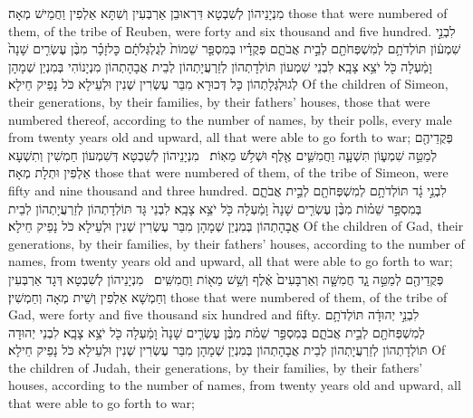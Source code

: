 {מִנְיָנֵיהוֹן לְשִׁבְטָא דִּרְאוּבֵן אַרְבְּעִין וְשִׁתָּא אַלְפִין וַחֲמֵישׁ מְאָה׃}
{those that were numbered of them, of the tribe of Reuben, were forty and six thousand and five hundred.}{}
{לִבְנֵ֣י שִׁמְע֔וֹן תּוֹלְדֹתָ֥ם לְמִשְׁפְּחֹתָ֖ם לְבֵ֣ית אֲבֹתָ֑ם פְּקֻדָ֗יו בְּמִסְפַּ֤ר שֵׁמוֹת֙ לְגֻלְגְּלֹתָ֔ם כׇּל\maqqaf זָכָ֗ר מִבֶּ֨ן עֶשְׂרִ֤ים שָׁנָה֙ וָמַ֔עְלָה כֹּ֖ל יֹצֵ֥א צָבָֽא׃}
{לִבְנֵי שִׁמְעוֹן תּוֹלְדָתְהוֹן לְזַרְעֲיָתְהוֹן לְבֵית אֲבָהָתְהוֹן מִנְיָנוֹהִי בְּמִנְיַן שְׁמָהָן לְגוּלְגְּלָתְהוֹן כָּל דְּכוּרָא מִבַּר עֶשְׂרִין שְׁנִין וּלְעֵילָא כֹּל נָפֵיק חֵילָא׃}
{Of the children of Simeon, their generations, by their families, by their fathers’ houses, those that were numbered thereof, according to the number of names, by their polls, every male from twenty years old and upward, all that were able to go forth to war;}{}
{פְּקֻדֵיהֶ֖ם לְמַטֵּ֣ה שִׁמְע֑וֹן תִּשְׁעָ֧ה וַחֲמִשִּׁ֛ים אֶ֖לֶף וּשְׁלֹ֥שׁ מֵאֽוֹת׃ \petucha }
{מִנְיָנֵיהוֹן לְשִׁבְטָא דְּשִׁמְעוֹן חַמְשִׁין וְתִשְׁעָא אַלְפִין וּתְלָת מְאָה׃}
{those that were numbered of them, of the tribe of Simeon, were fifty and nine thousand and three hundred.}{}
{לִבְנֵ֣י גָ֔ד תּוֹלְדֹתָ֥ם לְמִשְׁפְּחֹתָ֖ם לְבֵ֣ית אֲבֹתָ֑ם בְּמִסְפַּ֣ר שֵׁמ֗וֹת מִבֶּ֨ן עֶשְׂרִ֤ים שָׁנָה֙ וָמַ֔עְלָה כֹּ֖ל יֹצֵ֥א צָבָֽא׃}
{לִבְנֵי גָּד תּוֹלְדָתְהוֹן לְזַרְעֲיָתְהוֹן לְבֵית אֲבָהָתְהוֹן בְּמִנְיַן שְׁמָהָן מִבַּר עֶשְׂרִין שְׁנִין וּלְעֵילָא כֹּל נָפֵיק חֵילָא׃}
{Of the children of Gad, their generations, by their families, by their fathers’ houses, according to the number of names, from twenty years old and upward, all that were able to go forth to war;}{}
{פְּקֻדֵיהֶ֖ם לְמַטֵּ֣ה גָ֑ד חֲמִשָּׁ֤ה וְאַרְבָּעִים֙ אֶ֔לֶף וְשֵׁ֥שׁ מֵא֖וֹת וַחֲמִשִּֽׁים׃ \petucha }
{מִנְיָנֵיהוֹן לְשִׁבְטָא דְּגָד אַרְבְּעִין וְחַמְשָׁא אַלְפִין וְשֵׁית מְאָה וְחַמְשִׁין׃}
{those that were numbered of them, of the tribe of Gad, were forty and five thousand six hundred and fifty.}{}
{לִבְנֵ֣י יְהוּדָ֔ה תּוֹלְדֹתָ֥ם לְמִשְׁפְּחֹתָ֖ם לְבֵ֣ית אֲבֹתָ֑ם בְּמִסְפַּ֣ר שֵׁמֹ֗ת מִבֶּ֨ן עֶשְׂרִ֤ים שָׁנָה֙ וָמַ֔עְלָה כֹּ֖ל יֹצֵ֥א צָבָֽא׃}
{לִבְנֵי יְהוּדָה תּוֹלְדָתְהוֹן לְזַרְעֲיָתְהוֹן לְבֵית אֲבָהָתְהוֹן בְּמִנְיַן שְׁמָהָן מִבַּר עֶשְׂרִין שְׁנִין וּלְעֵילָא כֹּל נָפֵיק חֵילָא׃}
{Of the children of Judah, their generations, by their families, by their fathers’ houses, according to the number of names, from twenty years old and upward, all that were able to go forth to war;}{}
